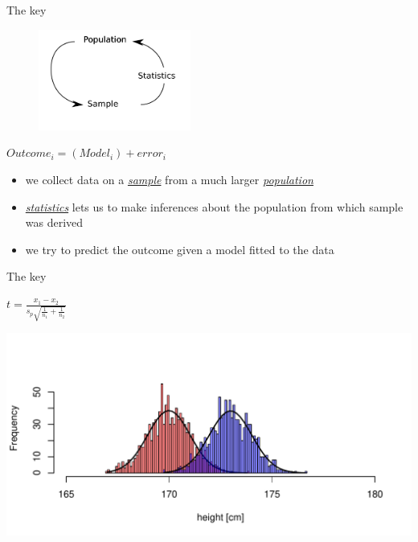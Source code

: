 \documentclass{beamer}\usepackage[]{graphicx}\usepackage[]{color}
\makeatletter
\def\maxwidth{ %
  \ifdim\Gin@nat@width>\linewidth
    \linewidth
  \else
    \Gin@nat@width
  \fi
}
\newenvironment{knitrout}{}{} %
\makeatother
\begin{document}
\begin{frame}
\begin{block}{The key}
\begin{center}
\begin{figure}
\includegraphics[width=5cm]{Images/stats.png}
\end{figure}
$Outcome_i=(Model_i)+error_i$
\end{center}
\begin{itemize}
\footnotesize
\item we collect data on a \underline{\textit{sample}} from a much larger \underline{\textit{population}}
\item \underline{\textit{statistics}} lets us to make inferences about the population from which sample was derived
\item we try to predict the outcome given a model fitted to the data
\end{itemize}
\end{block}
\end{frame}

\begin{frame}
\begin{block}{The key}
\begin{flushright}
$t=\frac{x_1-x_2}{s_p\sqrt{\frac{1}{n_1}+\frac{1}{n_2}}}$
\end{flushright}
\begin{knitrout}
\color{fgcolor}
\includegraphics[width=\maxwidth]{figure/ttest-1} 

\end{knitrout}
\end{block}
\end{frame}
\end{document}
